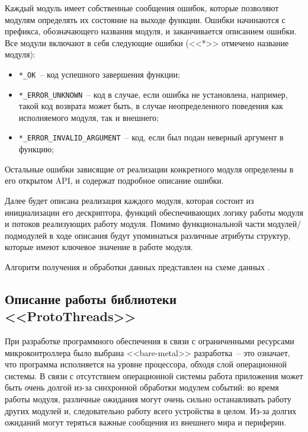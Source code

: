 Каждый модуль имеет собственные сообщения ошибок, которые позволяют модулям определять их состояние на выходе функции.
Ошибки начинаются с префикса, обозначающего названия модуля, и заканчивается описанием ошибки. Все модули включают в себя следующие
ошибки (<<*>> отмечено название модуля):

\begin{itemize}
    \item \lstinline{*_OK}~-- код успешного завершения функции;
    \item \lstinline{*_ERROR_UNKNOWN}~-- код в случае, если ошибка не установлена, например, 
    такой код возврата может быть, в случае неопределенного поведения как исполняемого модуля, так и внешнего;
    \item \lstinline{*_ERROR_INVALID_ARGUMENT}~-- код, если был подан неверный аргумент в функцию;
\end{itemize}

Остальные ошибки зависящие от реализации конкретного модуля определены в его открытом API, и содержат подробное описание ошибки.

Далее будет описана реализация каждого модуля, которая состоит из инициализации его дескриптора, функций обеспечивающих логику работы модуля
и потоков реализующих работу модуля. Помимо функциональной части модулей/подмодулей в ходе описания будут упоминаться различные атрибуты структур,
которые имеют ключевое значение в работе модуля.

Алгоритм получения и обработки данных представлен на схеме
данных \dataScheme. 

\subsection{Описание работы библиотеки <<ProtoThreads>>}
При разработке программного обеспечения в связи с ограниченными ресурсами микроконтроллера было выбрана <<bare-metal>>
разработка~-- это означает, что программа исполняется на уровне процессора, обходя слой операционной системы.
В связи с отсутствием операционной системы работа приложения может быть очень долгой из-за синхронной обработки модулем событий:
во время работы модуля, различные ожидания могут очень сильно останавливать работу других модулей и, следовательно работу всего устройства в целом.
Из-за долгих ожиданий могут теряться важные сообщения из внешнего мира и периферии.

